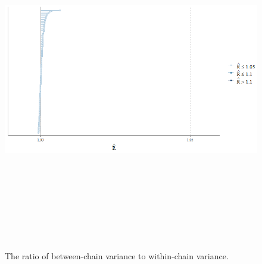 \begin{figure}[H]
	\centering
	\includegraphics[width=15cm,height=15cm,keepaspectratio]{graphics/rhat.png}
	\caption{The ratio of between-chain variance to within-chain variance.}
	\label{fig:rhat}
\end{figure}


